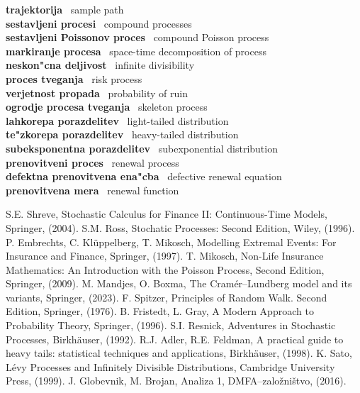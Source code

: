 \documentclass[12pt, a4paper, reqno]{amsart}
\theoremstyle{definition}
\theoremstyle{plain}
\newcommand{\1}{\mathds{1}}
\begin{document}
\noindent
\textbf{trajektorija} \ sample path \\
\textbf{sestavljeni procesi} \  compound processes \\
\textbf{sestavljeni Poissonov proces} \ compound Poisson process \\
\textbf{markiranje procesa} \ space-time decomposition of process \\
\textbf{neskon"cna deljivost} \ infinite divisibility \\
\textbf{proces tveganja} \ risk process \\
\textbf{verjetnost propada} \ probability of ruin \\
\textbf{ogrodje procesa tveganja} \ skeleton process \\
\textbf{lahkorepa porazdelitev} \ light-tailed distribution \\
\textbf{te"zkorepa porazdelitev} \ heavy-tailed distribution \\
\textbf{subeksponentna porazdelitev} \ subexponential distribution \\
\textbf{prenovitveni proces} \ renewal process \\
\textbf{defektna prenovitvena ena"cba} \ defective renewal equation \\
\textbf{prenovitvena mera} \ renewal function \\

\begin{thebibliography}{99}
S.E. Shreve, Stochastic Calculus for Finance II: Continuous-Time Models, Springer, (2004).
S.M. Ross, Stochatic Processes: Second Edition, Wiley, (1996).
P. Embrechts, C. Klüppelberg, T. Mikosch, Modelling Extremal Events: For Insurance and Finance, Springer, (1997).
T. Mikosch, Non-Life Insurance Mathematics: An Introduction with the Poisson Process, Second Edition, Springer, (2009).
M. Mandjes, O. Boxma, The Cramér--Lundberg model and its variants, Springer, (2023).
F. Spitzer, Principles of Random Walk. Second Edition, Springer, (1976).
B. Fristedt, L. Gray, A Modern Approach to Probability Theory, Springer, (1996).
S.I. Resnick, Adventures in Stochastic Processes, Birkhäuser, (1992).
R.J. Adler, R.E. Feldman, A practical guide to heavy tails: statistical techniques and applications, Birkhäuser, (1998).
K. Sato, Lévy Processes and Infinitely Divisible Distributions, Cambridge University Press, (1999).
J. Globevnik, M. Brojan, Analiza 1, DMFA--založništvo, (2016).
\end{thebibliography}
\end{document}
